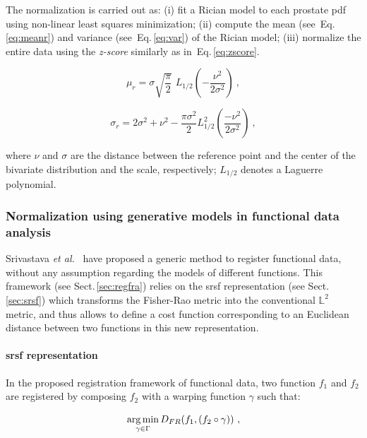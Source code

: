 The normalization is carried out as: 
(i) fit a Rician model to each prostate \ac{pdf} using non-linear least squares minimization; 
(ii) compute the mean (see~Eq.\,\eqref{eq:meanr}) and variance (see~Eq.\,\eqref{eq:var}) of the Rician model;
(iii) normalize the entire data using the \textit{z-score} similarly as in~Eq.\,\eqref{eq:zscore}.

\begin{equation}
  \mu_{r} = \sigma  \sqrt{\frac{\pi}{2}}\,\,L_{1/2}(-\frac{\nu^2}{2\sigma^2})  \ ,
  \label{eq:meanr}
\end{equation}

\begin{equation}
  \sigma_{r} = 2\sigma^2+\nu^2-\frac{\pi\sigma^2}{2}L_{1/2}^2\left(\frac{-\nu^2}{2\sigma^2}\right)  \ ,
  \label{eq:var}
\end{equation}

\noindent where $\nu$ and $\sigma$ are the distance between the reference point and the center of the bivariate distribution and the scale, respectively; $L_{1/2}$ denotes a Laguerre polynomial.

\subsubsection{Normalization using generative models in functional data analysis}\label{subsubsec:chp5:T2-norm:gen-model}

Srivastava \textit{et al.}~\cite{Srivastava2011} have proposed a generic method to register functional data, without any assumption regarding the models of different functions. 
This framework (see Sect.\,\ref{sec:regfra}) relies on the \ac{srsf} representation (see Sect.\,\ref{sec:srsf}) which transforms the Fisher-Rao metric into the conventional $\mathbb{L}^2$ metric, and thus allows to define a cost function corresponding to an Euclidean distance between two functions in this new representation.

\paragraph{\acl*{srsf} representation} \label{par:chp5:T2-norm:srsf}

In the proposed registration framework of functional data, two function $f_1$ and $f_2$ are registered by composing $f_2$ with a warping function $\gamma$ such that:

\begin{equation}
  \operatorname*{arg\,min}_{\gamma \in \Gamma} D_{FR}(f_1, (f_2 \circ \gamma)) \ ,
  \label{eq:regfun}
\end{equation}

